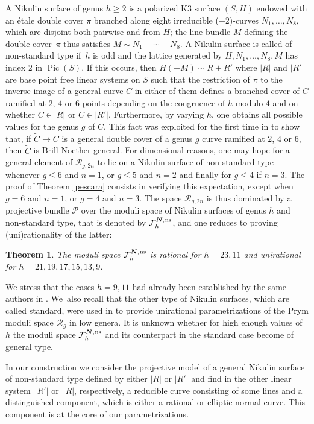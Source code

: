 \documentclass[11pt]{article}
\newcommand{\ns}{{\mkern1mu\mathrm{ns}}}
\newcommand{\bN}{\boldsymbol{N}}
\theoremstyle{plain}
\newtheorem{thm}{Theorem}[section]
\theoremstyle{definition}
\DeclareMathOperator{\Pic}{Pic}
\newcommand\F{{\mathcal F}}
\renewcommand\P{{\mathcal P}}
\newcommand\R{{\mathcal R}}
\begin{document}
A Nikulin surface of genus $h\geq 2$ is a polarized K3 surface $(S,H)$ endowed with an étale double cover $\pi$ branched along eight irreducible ($-2$)-curves $N_1,\ldots,N_8$, which are disjoint both pairwise and from $H$; the line bundle $M$ defining the double cover~$\pi$ thus satisfies $M\sim N_1+\cdots+N_8$. A Nikulin surface is called of non-standard type if~$h$ is odd and the lattice generated by $H,N_1,\ldots,N_8,M$ has index $2$ in $\Pic(S)$. If this occurs, then $H(-M)\sim R+R'$ where $|R|$ and $|R'|$ are base point free linear systems on $S$ \cite{GS} such that the restriction of $\pi$ to the inverse image of a general curve $C$ in either of them defines a branched cover of $C$ ramified at $2$, $4$ or $6$ points depending on the congruence of $h$ modulo $4$ and on whether $C\in |R|$ or $C\in |R'|$. Furthermore, by varying $h$, one obtains all possible values for the genus $g$ of $C$. This fact was exploited for the first time in \cite{DL} to show that, if $\widetilde C\to C$ is a general double cover of a genus $g$ curve ramified at $2$, $4$ or $6$, then $\widetilde C$ is Brill-Noether general.
For dimensional reasons, one may hope for a general element of $\mathcal R_{g,2n}$ to lie on a Nikulin surface of non-standard type whenever $g\leq 6$ and $n=1$, or $g\leq 5$ and $n=2$ and finally for $g\leq 4$ if $n=3$. The proof of Theorem \ref{pescara} consists in verifying this expectation, except when $g=6$ and $n=1$, or $g=4$ and $n=3$. The space $\R_{g,2n}$ is thus dominated by a projective bundle $\P$ over the moduli space of Nikulin surfaces of genus $h$ and non-standard type, that is denoted by $\F_h^{\bN,\ns}$, and one reduces to proving (uni)rationality of the latter:
\begin{thm}\label{moduli}
The moduli space $\F_h^{\bN,\ns}$ is rational for $h=23,11$ and unirational for $h=21,19,17, 15,13,9$.
\end{thm}
We stress that the cases $h=9,11$ had already been established by the same authors in \cite{KLV2}. We~also recall that the other type of Nikulin surfaces, which are called standard, were used in \cite{FV1} to provide unirational parametrizations of the Prym moduli space $\R_g$ in low genera.
It is unknown whether for high enough values of $h$ the moduli space $\F_h^{\bN,\ns}$ and its counterpart in the standard case become of general type.

In our construction we consider the projective model of a general Nikulin surface of non-standard type defined by either $|R|$ or $|R'|$ and find in the other linear system~$|R'|$ or~$|R|$, respectively, a reducible curve consisting of some lines and a distinguished component, which is either a rational or elliptic normal curve. This component is at the core of our parametrizations.
\end{document}
